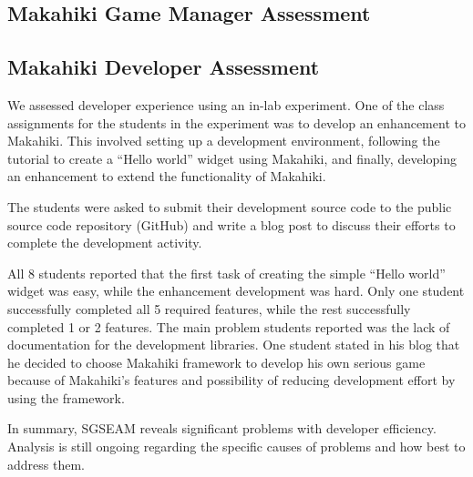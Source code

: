 \subsection{Makahiki Game Manager Assessment}

\subsection{Makahiki Developer Assessment}

We assessed developer experience using an in-lab experiment. One of the class assignments
for the students in the experiment was to develop an enhancement to Makahiki.  This
involved setting up a development environment, following the tutorial to create a ``Hello
world'' widget using Makahiki, and finally, developing an enhancement to extend the
functionality of Makahiki.

The students were asked to submit their development source code to the
public source code repository (GitHub) and write a blog post to
discuss their efforts to complete the development activity.

All 8 students reported that the first task of creating the simple ``Hello world'' widget
was easy, while the enhancement development was hard. Only one student successfully
completed all 5 required features, while the rest successfully completed 1 or 2
features. The main problem students reported was the lack of documentation for the
development libraries. One student stated in his blog that he decided to choose Makahiki
framework to develop his own serious game because of Makahiki's features and possibility
of reducing development effort by using the framework.

In summary, SGSEAM reveals significant problems with developer efficiency.
Analysis is still ongoing regarding the specific causes of problems and how best to
address them.
